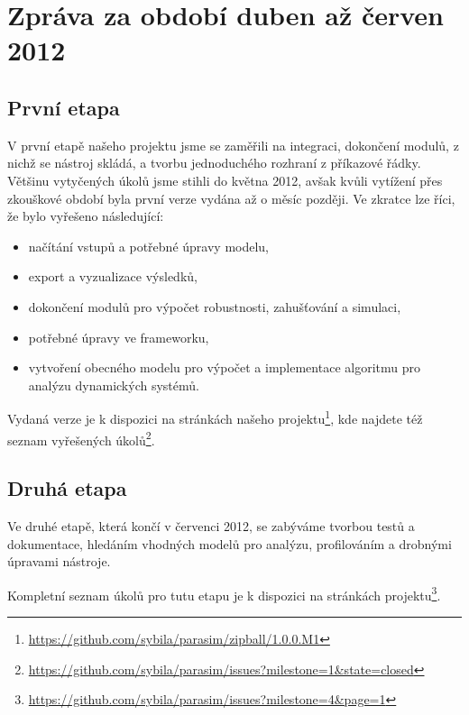 \documentclass{article}
\begin{document}
\header

\section{Zpráva za období duben až červen 2012}

\subsection{První etapa}

V první etapě našeho projektu jsme se zaměřili na integraci, dokončení modulů,
z nichž se nástroj skládá, a tvorbu jednoduchého rozhraní
z příkazové řádky. Většinu vytyčených úkolů jsme stihli do května 2012, avšak
kvůli vytížení přes zkouškové období byla první verze vydána až o měsíc později.
Ve zkratce lze říci, že bylo vyřešeno následující:

\begin{itemize}
    \item   načítání vstupů a potřebné úpravy modelu,
    \item   export a vyzualizace výsledků,
    \item   dokončení modulů pro výpočet robustnosti, zahušťování a simulaci,
    \item   potřebné úpravy ve frameworku,
    \item   vytvoření obecného modelu pro výpočet a implementace algoritmu pro analýzu dynamických systémů.
\end{itemize}


Vydaná verze je k dispozici na stránkách našeho projektu\footnote{\url{https://github.com/sybila/parasim/zipball/1.0.0.M1}},
kde najdete též seznam vyřešených úkolů\footnote{\url{https://github.com/sybila/parasim/issues?milestone=1&state=closed}}.

\subsection{Druhá etapa}

Ve druhé etapě, která končí v červenci 2012, se zabýváme tvorbou testů a dokumentace,
hledáním vhodných modelů pro analýzu, profilováním a drobnými úpravami nástroje.

Kompletní seznam úkolů pro tutu etapu je k dispozici na stránkách projektu\footnote{\url{https://github.com/sybila/parasim/issues?milestone=4&page=1}}.
\end{document}
